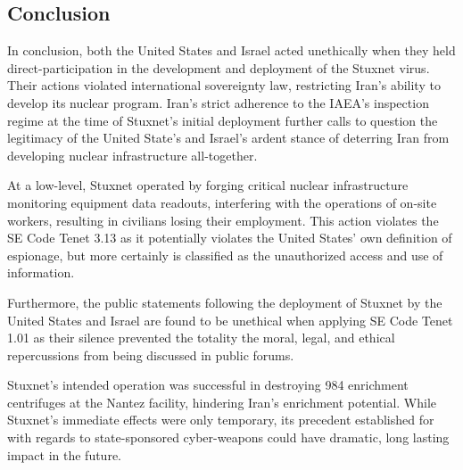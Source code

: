 \documentclass[12pt]{article}
\begin{document}
\begin{multicols}{2}
\section{Conclusion}

In conclusion, both the United States and Israel acted unethically when they held direct-participation in the development and deployment of the Stuxnet virus. Their actions violated international sovereignty law, restricting Iran's ability to develop its nuclear program. Iran's strict adherence to the IAEA's inspection regime at the time of Stuxnet's initial deployment further calls to question the legitimacy of the United State's and Israel's ardent stance of deterring Iran from developing nuclear infrastructure all-together.

At a low-level, Stuxnet operated by forging critical nuclear infrastructure monitoring equipment data readouts, interfering with the operations of on-site workers, resulting in civilians losing their employment. This action violates the SE Code Tenet 3.13 as it potentially violates the United States' own definition of espionage, but more certainly is classified as the unauthorized access and use of information.

Furthermore, the public statements following the deployment of Stuxnet by the United States and Israel are found to be unethical when applying SE Code Tenet 1.01 as their silence prevented the totality the moral, legal, and ethical repercussions from being discussed in public forums.

Stuxnet's intended operation was successful in destroying 984 enrichment centrifuges at the Nantez facility, hindering Iran's enrichment potential. While Stuxnet's immediate effects were only temporary,  its precedent established for with regards to state-sponsored cyber-weapons could have dramatic, long lasting impact in the future.


\end{multicols}




\newpage

\end{document}
